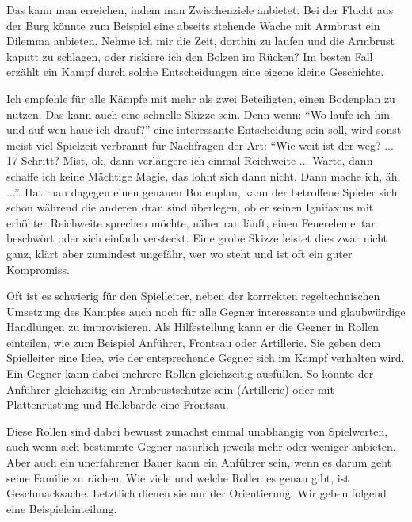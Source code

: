 Das kann man erreichen, indem man Zwischenziele anbietet.
Bei der Flucht aus der Burg könnte zum Beispiel eine abseits stehende Wache mit Armbrust ein Dilemma anbieten.
Nehme ich mir die Zeit, dorthin zu laufen und die Armbrust kaputt zu schlagen, oder riskiere ich den Bolzen im Rücken?
Im besten Fall erzählt ein Kampf durch solche Entscheidungen eine eigene kleine Geschichte.

Ich empfehle für alle Kämpfe mit mehr als zwei Beteiligten, einen Bodenplan zu nutzen.
Das kann auch eine schnelle Skizze sein.
Denn wenn: \enquote{Wo laufe ich hin und auf wen haue ich drauf?} eine interessante Entscheidung sein soll, wird sonst meist viel Spielzeit verbrannt für Nachfragen der Art: \enquote{Wie weit ist der weg? ... 17 Schritt? Mist, ok, dann verlängere ich einmal Reichweite ... Warte, dann schaffe ich keine Mächtige Magie, das lohnt sich dann nicht. Dann mache ich, äh, ...}.
Hat man dagegen einen genauen Bodenplan, kann der betroffene Spieler sich schon während die anderen dran sind überlegen, ob er seinen Ignifaxius mit erhöhter Reichweite sprechen möchte, näher ran läuft, einen Feuerelementar beschwört oder sich einfach versteckt. Eine grobe Skizze leistet dies zwar nicht ganz, klärt aber zumindest ungefähr, wer wo steht und ist oft ein guter Kompromiss.

\vfill


\neueseite

Oft ist es schwierig für den Spielleiter, neben der korrrekten regeltechnischen Umsetzung des Kampfes auch noch für alle Gegner interessante und glaubwürdige Handlungen zu improvisieren.
Als Hilfestellung kann er die Gegner in Rollen einteilen, wie zum Beispiel Anführer, Frontsau oder Artillerie.
Sie geben dem Spielleiter eine Idee, wie der entsprechende Gegner sich im Kampf verhalten wird.
Ein Gegner kann dabei mehrere Rollen gleichzeitig ausfüllen. So könnte der Anführer gleichzeitig ein Armbrustschütze sein (Artillerie)
oder mit Plattenrüstung und Hellebarde eine Frontsau. 

Diese Rollen sind dabei bewusst zunächst einmal unabhängig von Spielwerten, auch wenn sich bestimmte Gegner natürlich jeweils mehr oder weniger anbieten.
Aber auch ein unerfahrener Bauer kann ein Anführer sein, wenn es darum geht seine Familie zu rächen.
Wie viele und welche Rollen es genau gibt, ist Geschmacksache.
Letztlich dienen sie nur der Orientierung.
Wir geben folgend eine Beispieleinteilung.

